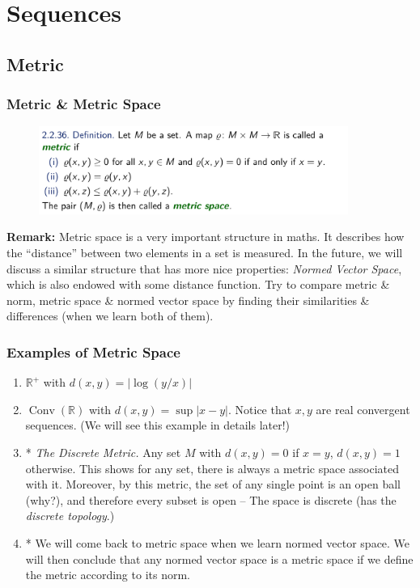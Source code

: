 \documentclass[10pt, t]{beamer}
\renewcommand{\emph}[1]{{\color{themecolor}\textsl{#1}}}
\newcommand{\R}{\mathbb{R}}
\begin{document}
\section{Sequences}
\subsection{Metric}
\begin{frame}
    \frametitle{Metric \& Metric Space}
    \begin{figure}[H]
        \centering
        \includegraphics[width=0.9\textwidth]{2020-10-13-18-54-20.png}
    \end{figure}
    \textbf{Remark:} Metric space is a very important structure in maths. It describes how the ``distance'' between two elements in a set is measured. In the future, we will discuss a similar structure that has more nice properties: \emph{Normed Vector Space}, which is also endowed with some distance function. Try to compare metric \& norm, metric space \& normed vector space by finding their similarities \& differences (when we learn both of them).\\
\end{frame}

\begin{frame}
    \frametitle{Examples of Metric Space}

    \begin{enumerate}
        \item $\R^+$ with $d(x,y)=|\log(y/x)|$
        \item $\operatorname{Conv}(\R)$ with $d(x,y)=\sup|x-y|$. Notice that $x,y$ are real convergent sequences. (We will see this example in details later!)
        \item * \emph{The Discrete Metric.} Any set $M$ with $d(x,y)=0$ if $x=y$, $d(x,y)=1$ otherwise. This shows for any set, there is always a metric space associated with it. Moreover, by this metric, the set of any single point is an open ball (why?), and therefore every subset is open -- The space is discrete (has the \emph{discrete topology}.)
        \item * We will come back to metric space when we learn normed vector space. We will then conclude that any normed vector space is a metric space if we define the metric according to its norm.
    \end{enumerate}

\end{frame}
\end{document}
